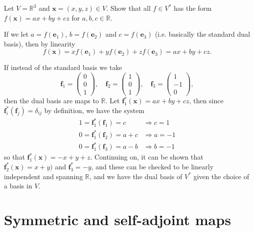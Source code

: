 \documentclass[letter-paper]{tufte-book}
\newenvironment{example}[1][Example]{\begin{trivlist}
\item[\hskip \labelsep {\bfseries #1}]}{\end{trivlist}}
\newcommand{\eb}{{\boldsymbol{e}}}
\newcommand{\fb}{{\boldsymbol{f}}}
\newcommand{\xb}{{\boldsymbol{x}}}
\begin{document}
\begin{example}
  Let $V = \mathbb{R}^3$ and $\xb = (x,y,z) \in V$. Show that all $f\in V^*$ has the form $f(\xb) = ax + by + cz$ for $a,b,c\in\mathbb{R}$.
  
  If we let $a = f(\eb_1)$, $b = f(\eb_2)$ and $c = f(\eb_3)$ (i.e. basically the standard dual basis), then by linearity
  \begin{equation*}
    f(\xb) = x f(\eb_1) + y f(\eb_2) + z f(\eb_3) = ax + by + cz.
  \end{equation*}
  
  If instead of the standard basis we take
  \begin{equation*}
    \fb_1 = \begin{pmatrix}0 \\ 0 \\ 1 \end{pmatrix}, \quad 
    \fb_2 = \begin{pmatrix}1 \\ 0 \\ 1 \end{pmatrix}, \quad 
    \fb_3 = \begin{pmatrix}1 \\ -1 \\ 0 \end{pmatrix},
  \end{equation*}
  then the dual basis are maps to $\mathbb{R}$. Let $\fb_1^*(\xb) = ax + by + cz$, then since $\fb_i^*(\fb_j) = \delta_{ij}$ by definition, we have the system
  \begin{align*}
    1 = \fb_1^* (\fb_1) = c & \Rightarrow c = 1\\
    0 = \fb_1^* (\fb_2) = a + c & \Rightarrow a = -1\\
    0 = \fb_1^* (\fb_3) = a - b & \Rightarrow b = -1
  \end{align*}
  so that $\fb_1^*(\xb) = -x + y + z$. Continuing on, it can be shown that $\fb_2^*(\xb) = x + y)$ and $\fb_3^* = -y$, and these can be checked to be linearly independent and spanning $\mathbb{R}$, and we have the dual basis of $V^*$ given the choice of a basis in $V$.
\end{example}


\section{Symmetric and self-adjoint maps}
\end{document}
